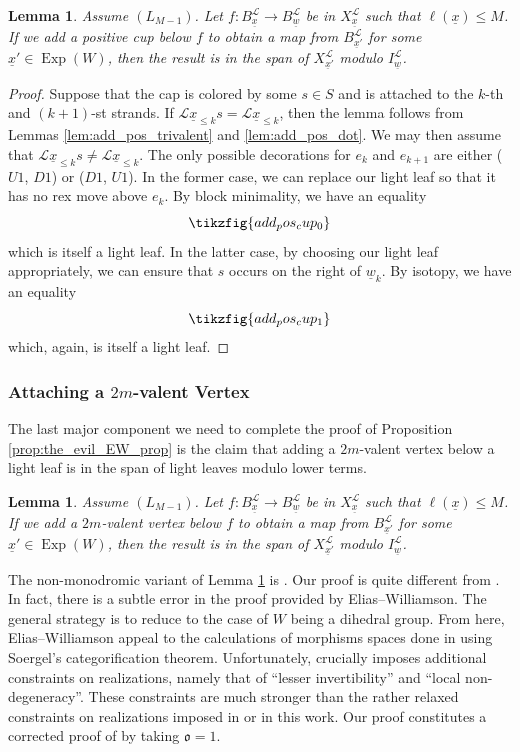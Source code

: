 \documentclass{amsart}
\newcommand{\scrL}{\mathcal{L}}
\newcommand{\fr}[1]{\mathfrak{#1}}
\DeclareMathOperator{\Exp}{Exp}
\newcommand{\uw}{\underline{w}}
\newcommand{\ux}{\underline{x}}
\newtheorem{lemma}[subsubsection]{Lemma}
\theoremstyle{definition}
\numberwithin{equation}{subsection}
\begin{document}
\begin{lemma}\label{lem:add_pos_cap}
    Assume $(L_{M-1})$. Let $f : B_{\ux}^{\scrL} \to B_{\uw}^{\scrL}$ be in $X_{\ux}^{\scrL}$ such that $\ell (\ux) \leq M$.
    If we add a positive cup below $f$ to obtain a map from $B_{\ux'}^{\scrL}$ for some $\ux' \in \Exp (W)$, then the result is in the span of $X_{\ux'}^{\scrL}$ modulo $I_{\uw}^{\scrL}$.
\end{lemma}
\begin{proof}
    Suppose that the cap is colored by some $s \in S$ and is attached to the $k$-th and $(k+1)$-st strands.
    If $\scrL \ux_{\leq k} s = \scrL \ux_{\leq k}$, then the lemma follows from Lemmas \ref{lem:add_pos_trivalent} and \ref{lem:add_pos_dot}.
    We may then assume that $\scrL \ux_{\leq k} s \neq \scrL \ux_{\leq k}$.
    The only possible decorations for $e_k$ and $e_{k+1}$ are either ($U1$, $D1$) or ($D1$, $U1$).
    In the former case, we can replace our light leaf so that it has no rex move above $e_k$. By block minimality, we have an equality
    \[\tikzfig{add_pos_cup_0}\]
    which is itself a light leaf.
    In the latter case, by choosing our light leaf appropriately, we can ensure that $s$ occurs on the right of $\uw_{k}$.
    By isotopy, we have an equality
    \[\tikzfig{add_pos_cup_1}\]
    which, again, is itself a light leaf.
\end{proof}


\subsubsection{Attaching a \texorpdfstring{$2m$}{2m}-valent Vertex}\label{subsec:add_neg_generators}

The last major component we need to complete the proof of Proposition \ref{prop:the_evil_EW_prop} is the claim that adding a $2m$-valent vertex below a light leaf is in the span of light leaves modulo lower terms.

\begin{lemma}\label{lem:add_2m_vertex}
    Assume $(L_{M-1})$. Let $f : B_{\ux}^{\scrL} \to B_{\uw}^{\scrL}$ be in $X_{\ux}^{\scrL}$ such that $\ell (\ux) \leq M$.
    If we add a $2m$-valent vertex below $f$ to obtain a map from $B_{\ux'}^{\scrL}$ for some $\ux' \in \Exp (W)$, then the result is in the span of $X_{\ux'}^{\scrL}$ modulo $I_{\uw}^{\scrL}$.
\end{lemma}

The non-monodromic variant of Lemma \ref{lem:add_2m_vertex} is \cite[Claim 7.13]{EW}.
Our proof is quite different from \cite{EW}. In fact, there is a subtle error in the proof provided by Elias--Williamson.
The general strategy is to reduce to the case of $W$ being a dihedral group. 
From here, Elias--Williamson appeal to the calculations of morphisms spaces done in \cite{Elib} using Soergel's categorification theorem.
Unfortunately, \cite{Elib} crucially imposes additional constraints on realizations, namely that of ``lesser invertibility'' and ``local non-degeneracy''.
These constraints are much stronger than the rather relaxed constraints on realizations imposed in \cite{EW} or in this work. 
Our proof constitutes a corrected proof of \cite[Claim 7.13]{EW} by taking $\fr{o} = 1$.
\end{document}
